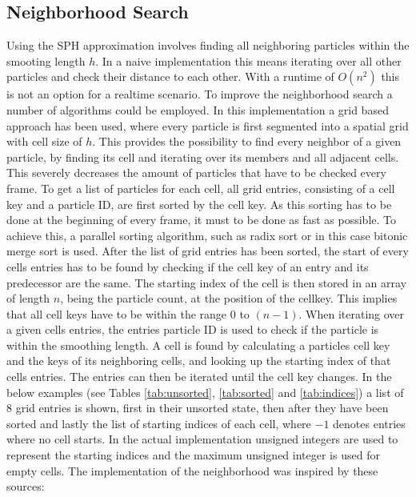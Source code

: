 \documentclass[intern]{cgMA}
\begin{document}
    \subsection{Neighborhood Search}
    Using the SPH approximation involves finding all neighboring particles within the smooting length $h$. In a naive implementation this means iterating over all other particles and check their distance to each other. With a runtime of $O(n^2)$ this is not an option for a realtime scenario. To improve the neighborhood search a number of algorithms could be employed. 
    In this implementation a grid based approach has been used, where every particle is first segmented into a spatial grid with cell size of $h$. This provides the possibility to find every neighbor of a given particle, by finding its cell and iterating over its members and all adjacent cells. This severely decreases the amount of particles that have to be checked every frame. 
    To get a list of particles for each cell, all grid entries, consisting of a cell key and a particle ID, are first sorted by the cell key. As this sorting has to be done at the beginning of every frame, it must to be done as fast as possible. To achieve this, a parallel sorting algorithm, such as radix sort or in this case bitonic merge sort is used. After the list of grid entries has been sorted, the start of every cells entries has to be found by checking if the cell key of an entry and its predecessor are the same. The starting index of the cell is then stored in an array of length $n$, being the particle count, at the position of the cellkey. This implies that all cell keys have to be within the range $0$ to $(n - 1)$. 
    When iterating over a given cells entries, the entries particle ID is used to check if the particle is within the smoothing length. A cell is found by calculating a particles cell key and the keys of its neighboring cells, and looking up the starting index of that cells entries. The entries can then be iterated until the cell key changes. In the below examples (see Tables \ref{tab:unsorted}, \ref{tab:sorted} and \ref{tab:indices}) a list of 8 grid entries is shown, first in their unsorted state, then after they have been sorted and lastly the list of starting indices of each cell, where $-1$ denotes entries where no cell starts. In the actual implementation unsigned integers are used to represent the starting indices and the maximum unsigned integer is used for empty cells. The implementation of the neighborhood was inspired by these sources: \cite{psuc} \cite{seblague} \cite{bitonic}
    
\end{document}
